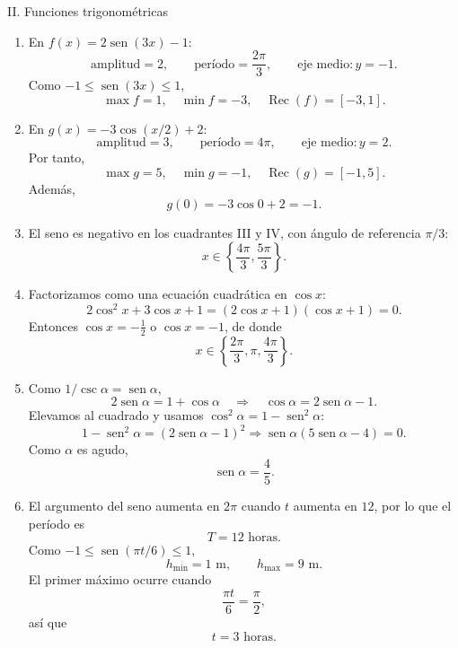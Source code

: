 \documentclass[letterpaper,12pt]{article}
\newcommand{\seno}{\operatorname{sen}}
\newcommand{\Rec}{\operatorname{Rec}}
\begin{document}
\begin{solbox}{II. Funciones trigonométricas}
\begin{enumerate}[label=\color{azulFuerte}\textbf{\arabic*.},leftmargin=*,start=7,itemsep=1em]
    \item En \(f(x)=2\seno(3x)-1\):
    \[
    \text{amplitud}=2,
    \qquad
    \text{período}=\frac{2\pi}{3},
    \qquad
    \text{eje medio}:y=-1.
    \]
    Como \(-1\leq\seno(3x)\leq1\),
    \[
        \boxed{\max f=1,\quad \min f=-3,\quad \Rec(f)=[-3,1]}.
    \]

    \item En \(g(x)=-3\cos(x/2)+2\):
    \[
    \text{amplitud}=3,
    \qquad
    \text{período}=4\pi,
    \qquad
    \text{eje medio}:y=2.
    \]
    Por tanto,
    \[
        \boxed{\max g=5,\quad \min g=-1,\quad \Rec(g)=[-1,5]}.
    \]
    Además,
    \[
        \boxed{g(0)=-3\cos0+2=-1}.
    \]

    \item El seno es negativo en los cuadrantes III y IV, con ángulo de referencia \(\pi/3\):
    \[
        \boxed{x\in\left\{\frac{4\pi}{3},\frac{5\pi}{3}\right\}}.
    \]

    \item Factorizamos como una ecuación cuadrática en \(\cos x\):
    \[
    2\cos^2x+3\cos x+1
    =(2\cos x+1)(\cos x+1)=0.
    \]
    Entonces \(\cos x=-\frac12\) o \(\cos x=-1\), de donde
    \[
        \boxed{x\in\left\{\frac{2\pi}{3},\pi,\frac{4\pi}{3}\right\}}.
    \]

    \item Como \(1/\csc\alpha=\seno\alpha\),
    \[
        2\seno\alpha=1+\cos\alpha
        \quad\Longrightarrow\quad
        \cos\alpha=2\seno\alpha-1.
    \]
    Elevamos al cuadrado y usamos \(\cos^2\alpha=1-\seno^2\alpha\):
    \[
    1-\seno^2\alpha=(2\seno\alpha-1)^2
    \Longrightarrow
    \seno\alpha(5\seno\alpha-4)=0.
    \]
    Como \(\alpha\) es agudo,
    \[
        \boxed{\seno\alpha=\frac45}.
    \]

    \item El argumento del seno aumenta en \(2\pi\) cuando \(t\) aumenta en \(12\), por lo que el período es
    \[
        \boxed{T=12\text{ horas}}.
    \]
    Como \(-1\leq\seno(\pi t/6)\leq1\),
    \[
        \boxed{h_{\min}=1\text{ m},\qquad h_{\max}=9\text{ m}}.
    \]
    El primer máximo ocurre cuando
    \[
        \frac{\pi t}{6}=\frac{\pi}{2},
    \]
    así que
    \[
        \boxed{t=3\text{ horas}}.
    \]
\end{enumerate}
\end{solbox}
\end{document}
